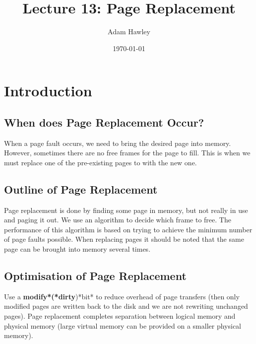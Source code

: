 \documentclass[11pt]{article}
\author{Adam Hawley}
\date{\today}
\title{Lecture 13: Page Replacement}
\begin{document}
\maketitle
\tableofcontents


\section{Introduction}
\label{sec:org8b10a5a}
\subsection{When does Page Replacement Occur?}
\label{sec:org6425452}
When a page fault occurs, we need to bring the desired page into memory.
However, sometimes there are no free frames for the page to fill.
This is when we must replace one of the pre-existing pages to with the new one.

\subsection{Outline of Page Replacement}
\label{sec:org007ac98}
Page replacement is done by finding some page in memory, but not really in use and paging it out.
We use an algorithm to decide which frame to free.
The performance of this algorithm is based on trying to achieve the minimum number of page faults possible.
When replacing pages it should be noted that the same page can be brought into memory several times.

\subsection{Optimisation of Page Replacement}
\label{sec:orgbc35d25}
Use a \textbf{modify*(*dirty})*bit* to reduce overhead of page transfers (then only modified pages are written back to the disk and we are not rewriting unchanged pages).
Page replacement completes separation between logical memory and physical memory (large virtual memory can be provided on a smaller physical memory).
\end{document}
